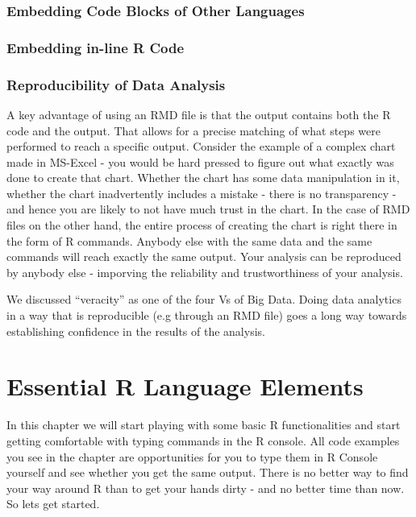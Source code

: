 \documentclass[]{krantz}
\begin{document}
\subsection{Embedding Code Blocks of Other
Languages}\label{embedding-code-blocks-of-other-languages}

\subsection{Embedding in-line R Code}\label{embedding-in-line-r-code}

\subsection{Reproducibility of Data
Analysis}\label{reproducibility-of-data-analysis}

A key advantage of using an RMD file is that the output contains both
the R code and the output. That allows for a precise matching of what
steps were performed to reach a specific output. Consider the example of
a complex chart made in MS-Excel - you would be hard pressed to figure
out what exactly was done to create that chart. Whether the chart has
some data manipulation in it, whether the chart inadvertently includes a
mistake - there is no transparency - and hence you are likely to not
have much trust in the chart. In the case of RMD files on the other
hand, the entire process of creating the chart is right there in the
form of R commands. Anybody else with the same data and the same
commands will reach exactly the same output. Your analysis can be
reproduced by anybody else - imporving the reliability and
trustworthiness of your analysis.

We discussed ``veracity'' as one of the four Vs of Big Data. Doing data
analytics in a way that is reproducible (e.g through an RMD file) goes a
long way towards establishing confidence in the results of the analysis.

\chapter{Essential R Language
Elements}\label{essential-r-language-elements}

In this chapter we will start playing with some basic R functionalities
and start getting comfortable with typing commands in the R console. All
code examples you see in the chapter are opportunities for you to type
them in R Console yourself and see whether you get the same output.
There is no better way to find your way around R than to get your hands
dirty - and no better time than now. So lets get started.
\end{document}
